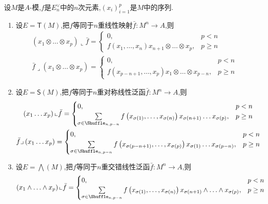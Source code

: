 \begin{example}{}{}
	设$M$是$A$-模,$f$是$E_{n}^{\vee}$中的$n$次元素,$\left(x_{i}\right)_{i=1}^{p}$是$M$中的序列.
	\begin{enumerate}
		\item 设$E=\mathsf{T}\left(M\right)$,把$f$等同于$n$重线性映射$\bar{f}:M^{n}\to A$,则
		\begin{gather*}
			\left(x_{1}\otimes\ldots\otimes x_{p}\right)\llcorner\bar{f}=
			\begin{cases}
				0,&p<n\\
				f\left(x_{1},\ldots,x_{n}\right)x_{n+1}\otimes\ldots\otimes x_{p},&p\geq n
			\end{cases}\\
			\bar{f}\lrcorner\left(x_{1}\otimes\ldots\otimes x_{p}\right)=
			\begin{cases}
				0,&p<n\\
				f\left(x_{p-n+1},\ldots,x_{p}\right)x_{1}\otimes\ldots\otimes x_{p-n},&p\geq n
			\end{cases}
		\end{gather*}
		\item 设$E=\mathsf{S}\left(M\right)$,把$f$等同于$n$重对称线性泛函$\bar{f}:M^{n}\to A$,则
		\begin{gather*}
			\left(x_{1}\ldots x_{p}\right)\llcorner\bar{f}=
			\begin{cases}
				0,&p<n\\
				\sum\limits_{\sigma\in\Shuffle_{n,p-n}}f\left(x_{\sigma\left(1\right)},\ldots,x_{\sigma\left(n\right)}\right)x_{\sigma\left(n+1\right)}\ldots x_{\sigma\left(p\right)},&p\geq n
			\end{cases}\\
			\bar{f}\lrcorner\left(x_{1}\ldots x_{p}\right)=
			\begin{cases}
				0,&p<n\\
				\sum\limits_{\sigma\in\Shuffle_{n,p-n}}f\left(x_{\sigma\left(p-n+1\right)},\ldots,x_{\sigma\left(p\right)}\right)x_{\sigma\left(1\right)}\ldots x_{\sigma\left(p-n\right)},&p\geq n
			\end{cases}
		\end{gather*}
		\item 设$E=\bigwedge\left(M\right)$,把$f$等同于$n$重交错线性泛函$\bar{f}:M^{n}\to A$,则
		\begin{gather*}
			\left(x_{1}\wedge\ldots\wedge x_{p}\right)\llcorner\bar{f}=
			\begin{cases}
				0,&p<n\\
				\sum\limits_{\sigma\in\Shuffle_{n,p-n}}f\left(x_{\sigma\left(1\right)},\ldots,x_{\sigma\left(n\right)}\right)x_{\sigma\left(n+1\right)}\wedge\ldots\wedge x_{\sigma\left(p\right)},&p\geq n

\end{cases}
\end{gather*}
\end{enumerate}
\end{example}
